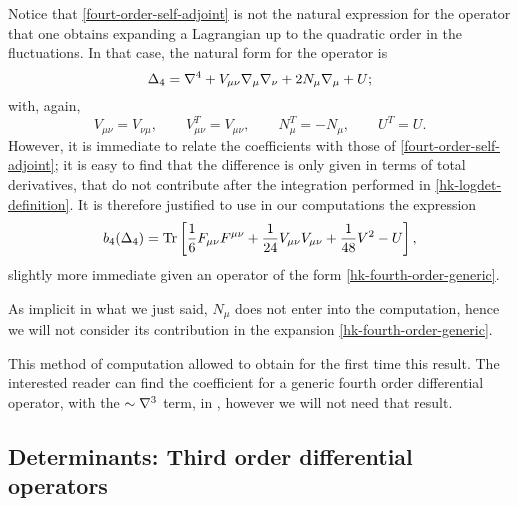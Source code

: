 

Notice that \eqref{fourt-order-self-adjoint} is not the natural expression for the operator that one obtains expanding a Lagrangian up to the quadratic order in the fluctuations. In that case, the natural form for the operator is
\begin{equation}\label{hk-fourth-order-generic}
\Delta_4 = { \mathcal{\nabla} }^4 + V_{\mu\nu} { \mathcal{\nabla} }_\mu  { \mathcal{\nabla} }_\nu +  2N_\mu { \mathcal{\nabla} }_\mu + U;
\end{equation}
with, again,
\begin{equation}\label{hk-fourth-order-generic-coefficeints}
{V}_{\mu\nu} = {V}_{\nu\mu}, 
	\qquad
{V}^T_{\mu\nu} = {V}_{\mu\nu},
	\qquad
{N}^T_{\mu} = - {N}_{\mu},
	\qquad
{U}^T = {U}.
\end{equation}
However, it is immediate to relate the coefficients with those of \eqref{fourt-order-self-adjoint}; it is easy to find that the difference is only given in terms of total derivatives, that do not contribute after the integration performed in \eqref{hk-logdet-definition}. It is therefore justified to use in our computations the expression
\begin{equation}\label{b4-coeff-4order}
b_4(\Delta_{4}) = \operatorname{Tr} \left[
	  \frac{1}{6} F_{\mu\nu} F^{\mu\nu}  
	+ \frac{1}{24} V_{\mu\nu} V_{\mu\nu}  
	+ \frac{1}{48}  V^2 
	-  U 
	\right],
\end{equation}
slightly more immediate given an operator of the form \eqref{hk-fourth-order-generic}.

As implicit in what we just said, $N_\mu$  does not enter into the computation, hence we will not consider its contribution in the expansion \eqref{hk-fourth-order-generic}.


This method of computation allowed \cite{Fradkin:1981iu} to obtain for the first time this result.
The interested reader can find the coefficient for a generic fourth order differential operator, with the $\sim { \mathcal{\nabla} }^3$ term, in \cite[p.~54]{Barvinsky:1985an}, however we will not need that result.




\subsection{Determinants: Third order differential operators}



